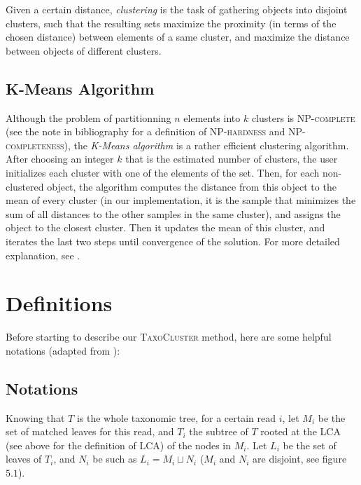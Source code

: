 \documentclass{report}
\begin{document}
Given a certain distance, \emph{clustering} is the task of gathering objects into disjoint clusters, such that the resulting sets maximize the proximity (in terms of the chosen distance) between elements of a same cluster, and maximize the distance between objects of different clusters.

\subsection{K-Means Algorithm} 

Although the problem of partitionning $n$ elements into $k$ clusters \cite{PartitionIsNPhard} is \textsc{NP-complete}\cite{NPhard} (see the note in bibliography for a definition of \textsc{NP-hardness} and \textsc{NP-completeness}), the \emph{K-Means algorithm} \cite{KMeans} is a rather efficient clustering algorithm. After choosing an integer $k$ that is the estimated number of clusters, the user initializes each cluster with one of the elements of the set. Then, for each non-clustered object, the algorithm computes the distance from this object to the mean of every cluster (in our implementation, it is the sample that minimizes the sum of all distances to the other samples in the same cluster), and assigns the object to the closest cluster. Then it updates the mean of this cluster, and iterates the last two steps until convergence of the solution. For more detailed explanation, see \cite{KMeans}.

\section{Definitions}

Before starting to describe our \textsc{TaxoCluster} method, here are some helpful notations (adapted from \cite{Tango1}):\\

\subsection{Notations}

Knowing that $T$ is the whole taxonomic tree, for a certain read $i$, let $M_{i}$ be the set of matched leaves for this read, and $T_{i}$ the subtree of $T$ rooted at the LCA (see above for the definition of LCA) of the nodes in $M_{i}$. Let $L_{i}$ be the set of leaves of $T_{i}$, and $N_{i}$ be such as $L_{i} = M_{i} \sqcup N_{i}$ ($M_{i}$ and $N_{i}$ are disjoint, see figure $5.1$).
\end{document}

